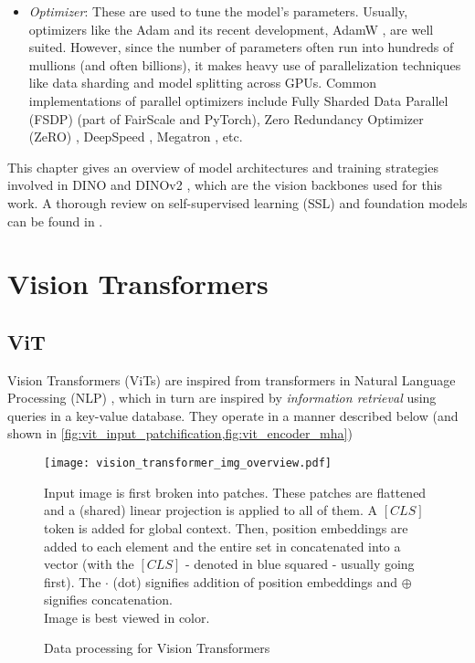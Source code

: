 \begin{itemize}
    \item \emph{Optimizer}: These are used to tune the model's
        parameters. Usually, optimizers like the Adam
        \cite{Kingma2014AdamAM} and its recent development, AdamW
        \cite{Loshchilov2017DecoupledWD}, are well suited. However,
        since the number of parameters often run into hundreds of
        mullions (and often billions), it makes heavy use of
        parallelization techniques like data sharding and model
        splitting across GPUs. Common implementations of parallel
        optimizers include Fully Sharded Data Parallel (FSDP)
        \cite{Xu2020AutomaticCS} (part of FairScale and PyTorch), Zero
        Redundancy Optimizer (ZeRO) \cite{Wang2023ZeROEE,
        Rajbhandari2019ZeROMO}, DeepSpeed \cite{Li2022DeepSpeedDE},
        Megatron \cite{Narayanan2021EfficientLL}, etc.
\end{itemize}

This chapter gives an overview of model architectures and training
strategies involved in DINO \cite{Caron2021EmergingPI} and DINOv2
\cite{Oquab2023DINOv2LR}, which are the vision backbones used for this
work. A thorough review on self-supervised learning (SSL) and
foundation models can be found in \cite{Balestriero2023ACO,
Gui2023ASO, Jaiswal2020ASO}.

\section{Vision Transformers}

\subsection{ViT}
\label{subsec:vit}

Vision Transformers (ViTs) \cite{Dosovitskiy2020AnII} are inspired
from transformers in Natural Language Processing (NLP)
\cite{Vaswani2017AttentionIA}, which in turn are inspired by
\emph{information retrieval} using queries in a key-value database.
They operate in a manner described below (and shown in
\cref{fig:vit_input_patchification,fig:vit_encoder_mha})

\begin{figure}
    \centering
    \texttt{[image: vision\_transformer\_img\_overview.pdf]}
    \caption{Data processing for Vision Transformers}
    \small
        Input image is first broken into patches. These patches are
        flattened and a (shared) linear projection is applied to all
        of them. A $\left[CLS\right]$ token is added for global
        context. Then, position embeddings are added to each element
        and the entire set in concatenated into a vector (with the
        $\left[CLS\right]$ - denoted in blue squared - usually going
        first). The $\cdot$ (dot) signifies addition of position
        embeddings and $\oplus$ signifies concatenation. \\
        Image is best viewed in color.
    \label{fig:vit_input_patchification}
\end{figure}


